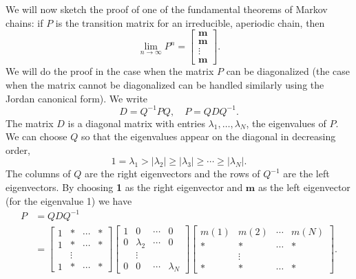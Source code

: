 \documentclass{stml-l}
\theoremstyle{definition}
\numberwithin{equation}{chapter}
\numberwithin{figure}{chapter}
\numberwithin{figure}{section}
\begin{document}
We will now sketch the proof of one of the fundamental theorems of
Markov chains: if $P$ is the transition matrix for an irreducible,
aperiodic chain, then
\begin{equation*}
\lim\limits_{n\rightarrow\infty}P^{n}=\left[\begin{array}{c}
\mathbf{m}\\
\mathbf{m}\\
\vdots\\
\mathbf{m}
\end{array}\right].
\end{equation*}
We will do the proof in the case when the matrix $P$ can be
diagonalized (the case when the matrix cannot be diagonalized can be
handled similarly using the Jordan canonical form). We write
\begin{equation*}
D=Q^{-1}PQ,\quad P=QDQ^{-1}.
\end{equation*}
The matrix $D$ is a diagonal matrix with entries
$\lambda_{1},\ldots,\lambda_{N}$, the eigenvalues of $P$. We can
choose $Q$ so that the eigenvalues appear on the diagonal in
decreasing order,
\begin{equation*}
1=\lambda_{1}>|\lambda_{2}|\geq|\lambda_{3}|\geq\cdots\geq|\lambda_{N}|.
\end{equation*}
The columns of $Q$ are the right eigenvectors and the rows of
$Q^{-1}$ are the left eigenvectors. By choosing \textbf{1} as the
right eigenvector and $\mathbf{m}$ as the left eigenvector (for the
eigenvalue 1) we have
\begin{align*}
P&=QDQ^{-1}\\
&=\left[\begin{array}{cccc}
1 & \ast & \cdots & \ast\\
1 & \ast & \cdots & \ast\\
  & \vdots &  & \\
1 & \ast & \cdots & \ast
\end{array}\right]\left[\begin{array}{cccc}1 & 0 & \cdots & 0\\ 0 & \lambda_{2} & \cdots & 0 \\  & \vdots &  &
\\0 & 0 & \cdots & \lambda_{N}\end{array}\right] \left[\begin{array}{cccc}
m(1) & m(2) & \cdots & m(N)\\
\ast & \ast & \cdots &\ast \\
 & \vdots &  &  \\
\ast & \ast & \cdots & \ast
\end{array}\right].
\end{align*}
\end{document}
